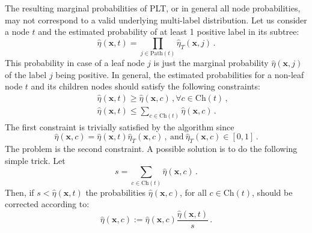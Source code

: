 \documentclass{article}
\newcommand{\Algo}[1]{\textsc{#1}}
\renewcommand{\vec}[1]{\boldsymbol{#1}}
\newcommand{\bx}{\vec{x}}
\newcommand{\heta}{\hat{\eta}}
\newcommand{\pa}[1]{\mathrm{pa}(#1)}
\newcommand{\Path}[1]{\mathrm{Path}(#1)}
\newcommand{\Children}[1]{\mathrm{Ch}(#1)}
\begin{document}
The resulting marginal probabilities of \Algo{PLT}, or in general all node probabilities, may not correspond to a valid underlying multi-label distribution. Let us consider a node $t$ and the estimated probability of at least 1 positive label in its subtree: 
$$
\heta(\bx, t) = \prod_{j \in \Path{t}} \heta_T(\bx, j) \,.
$$
This probability in case of a leaf node $j$ is just the marginal probability $\heta(\bx, j)$ of the label $j$ being positive.
In general, the estimated probabilities for a non-leaf node $t$ and its children nodes should satisfy the following constraints: 
\begin{eqnarray*}
&& \heta(\bx, t)  \ge \heta(\bx, c)\,, \forall c \in \Children{t}\,, \\
&& \heta(\bx, t)  \le \sum_{c \in \Children{t}}  \heta(\bx, c) \,. 
\end{eqnarray*}
The first constraint is trivially satisfied by the algorithm since 
$$
\heta(\bx, c) = \heta(\bx, t) \heta_T(\bx, c)\,,\mathrm{~and~}  \heta_T(\bx, c) \in [0,1]\,.
$$ 
The problem is the second constraint. A possible solution is to do the following simple trick. Let 
$$
s = \sum_{c \in \Children{t}} \heta(\bx, c) \,.
$$
Then, if $s < \heta(\bx, t)$ the probabilities $\heta(\bx, c)$, for all $c \in \Children{t}$, should be corrected according to:
$$
\heta(\bx, c) := \heta(\bx, c) \frac{\heta(\bx, t)}{s}\,.
$$

\end{document}
